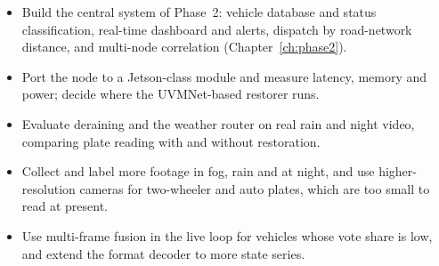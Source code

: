\begin{itemize}
  \item Build the central system of Phase~2: vehicle database and status
        classification, real-time dashboard and alerts, dispatch by
        road-network distance, and multi-node correlation
        (Chapter~\ref{ch:phase2}).
  \item Port the node to a Jetson-class module and measure latency, memory and
        power; decide where the UVMNet-based restorer runs.
  \item Evaluate deraining and the weather router on real rain and night video,
        comparing plate reading with and without restoration.
  \item Collect and label more footage in fog, rain and at night, and use
        higher-resolution cameras for two-wheeler and auto plates, which are
        too small to read at present.
  \item Use multi-frame fusion in the live loop for vehicles whose vote share is
        low, and extend the format decoder to more state series.
\end{itemize}
